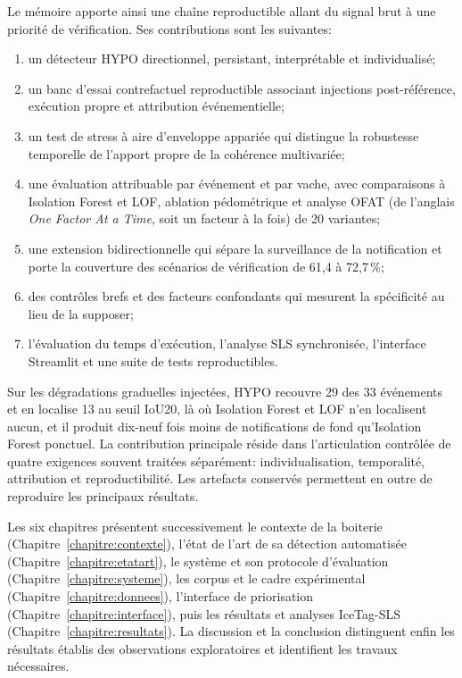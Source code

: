 \begin{introduction}
Le mémoire apporte ainsi une chaîne reproductible allant du signal brut à une priorité de
vérification. Ses contributions sont les suivantes:
\begin{enumerate}[itemsep=0pt, parsep=0pt, topsep=0.3\baselineskip]
  \item un détecteur HYPO directionnel, persistant, interprétable et individualisé;
  \item un banc d'essai contrefactuel reproductible associant injections post-référence,
  exécution propre et attribution événementielle;
  \item un test de stress à aire d'enveloppe appariée qui distingue la robustesse temporelle de l'apport
  propre de la cohérence multivariée;
  \item une évaluation attribuable par événement et par vache, avec comparaisons à Isolation
  Forest et LOF, ablation pédométrique et analyse OFAT (de l'anglais \emph{One Factor At a
  Time}, soit un facteur à la fois) de 20 variantes;
  \item une extension bidirectionnelle qui sépare la surveillance de la notification et porte
  la couverture des scénarios de vérification de 61,4 à 72,7\,\%;
  \item des contrôles brefs et des facteurs confondants qui mesurent la spécificité au lieu de
  la supposer;
  \item l'évaluation du temps d'exécution, l'analyse SLS synchronisée, l'interface Streamlit et
  une suite de tests reproductibles.
\end{enumerate}
Sur les dégradations graduelles injectées, HYPO recouvre 29 des 33 événements et en localise 13
au seuil IoU20, là où Isolation Forest et LOF n'en localisent aucun, et il produit dix-neuf fois
moins de notifications de fond qu'Isolation Forest ponctuel.
La contribution principale réside dans l'articulation contrôlée de quatre exigences souvent
traitées séparément: individualisation, temporalité, attribution et reproductibilité. Les
artefacts conservés permettent en outre de reproduire les principaux résultats.

Les six chapitres présentent successivement le contexte de la boiterie
(Chapitre~\ref{chapitre:contexte}), l'état de l'art de sa détection automatisée
(Chapitre~\ref{chapitre:etatart}), le système et son protocole d'évaluation
(Chapitre~\ref{chapitre:systeme}), les corpus et le cadre expérimental
(Chapitre~\ref{chapitre:donnees}), l'interface de priorisation
(Chapitre~\ref{chapitre:interface}), puis les résultats et analyses IceTag-SLS
(Chapitre~\ref{chapitre:resultats}). La discussion et la conclusion distinguent enfin les
résultats établis des observations exploratoires et identifient les travaux nécessaires.

\end{introduction}
